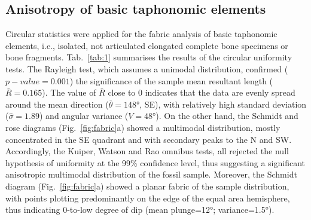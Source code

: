 \documentclass[5p,times,authoryear]{elsarticle}
\begin{document}
\subsection{Anisotropy of basic taphonomic elements}

Circular statistics were applied for the fabric analysis of basic taphonomic elements, i.e., isolated, not articulated elongated complete bone specimens or bone fragments. Tab.~\ref{tab:1} summarises the results of the circular uniformity tests. The Rayleigh test, which assumes a unimodal distribution, confirmed ($p-value=0.001$) the significance of the sample mean resultant length ($\bar{R}=0.165$). The value of $\bar{R}$ close to 0 indicates that the data are evenly spread around the mean direction ($\bar{\theta}=148°$, SE), with relatively high standard deviation ($\hat{\sigma}=1.89$) and angular variance ($V=48°$). On the other hand, the Schmidt and rose diagrams (Fig.~\ref{fig:fabric}a) showed a multimodal distribution, mostly concentrated in the SE quadrant and with secondary peaks to the N and SW. Accordingly, the Kuiper, Watson and Rao omnibus tests, all rejected the null hypothesis of uniformity at the 99\% confidence level, thus suggesting a significant anisotropic multimodal distribution of the fossil sample. Moreover, the Schmidt diagram (Fig.~\ref{fig:fabric}a) showed a planar fabric of the sample distribution, with points plotting predominantly on the edge of the equal area hemisphere, thus indicating 0-to-low degree of dip (mean plunge=12°; variance=1.5°).

\begin{table}[]
  \centering
  \caption{Values and $p-values$ of circular uniformity test statistics.}
  \label{tab:1}
  \vspace{.1in}
\end{table}
\end{document}
